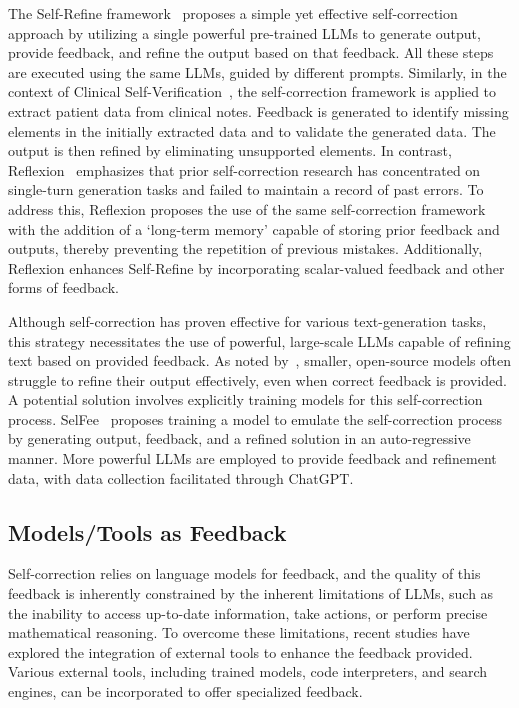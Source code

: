 \documentclass[a4paper,oneside]{book}
\begin{document}
The Self-Refine framework~\cite{madaan2023selfrefine} proposes a simple yet effective self-correction approach by utilizing a single powerful pre-trained LLMs to generate output, provide feedback, and refine the output based on that feedback. All these steps are executed using the same LLMs, guided by different prompts. Similarly, in the context of Clinical Self-Verification~\cite{gero2023selfverification}, the self-correction framework is applied to extract patient data from clinical notes. Feedback is generated to identify missing elements in the initially extracted data and to validate the generated data. The output is then refined by eliminating unsupported elements. In contrast, Reflexion~\cite{shinn2023reflexion} emphasizes that prior self-correction research has concentrated on single-turn generation tasks and failed to maintain a record of past errors. To address this, Reflexion proposes the use of the same self-correction framework with the addition of a `long-term memory' capable of storing prior feedback and outputs, thereby preventing the repetition of previous mistakes. Additionally, Reflexion enhances Self-Refine by incorporating scalar-valued feedback and other forms of feedback.

Although self-correction has proven effective for various text-generation tasks, this strategy necessitates the use of powerful, large-scale LLMs capable of refining text based on provided feedback. As noted by~\cite{madaan2023selfrefine}, smaller, open-source models often struggle to refine their output effectively, even when correct feedback is provided. A potential solution involves explicitly training models for this self-correction process. SelFee~\cite{selfee2023} proposes training a model to emulate the self-correction process by generating output, feedback, and a refined solution in an auto-regressive manner. More powerful LLMs are employed to provide feedback and refinement data, with data collection facilitated through ChatGPT.

\subsection{Models/Tools as Feedback}
Self-correction relies on language models for feedback, and the quality of this feedback is inherently constrained by the inherent limitations of LLMs, such as the inability to access up-to-date information, take actions, or perform precise mathematical reasoning. To overcome these limitations, recent studies have explored the integration of external tools to enhance the feedback provided. Various external tools, including trained models, code interpreters, and search engines, can be incorporated to offer specialized feedback.
\end{document}
